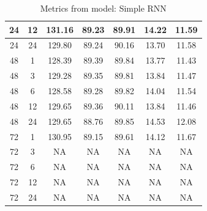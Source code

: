 \begin{table}[H]
\begin{tabular}{|c|c||c|c|c|c|c|}
		\hline
		24 & 12 & 131.16 & 89.23 & 89.91 & 14.22 & 11.59 \\
		\hline
		24 & 24 & 129.80 & 89.24 & 90.16 & 13.70 & 11.58 \\
		\hline
		48 &  1 & 128.39 & 89.39 & 89.84 & 13.77 & 11.43 \\
		\hline
		48 &  3 & 129.28 & 89.35 & 89.81 & 13.84 & 11.47 \\
		\hline
		48 &  6 & 128.58 & 89.28 & 89.82 & 14.04 & 11.54 \\
		\hline
		48 & 12 & 129.65 & 89.36 & 90.11 & 13.84 & 11.46 \\
		\hline
		48 & 24 & 129.65 & 88.76 & 89.85 & 14.53 & 12.08 \\
		\hline
		72 &  1 & 130.95 & 89.15 & 89.61 & 14.12 & 11.67 \\
		\hline
		72 &  3 &     NA &    NA &    NA &    NA &    NA \\
		\hline
		72 &  6 &     NA &    NA &    NA &    NA &    NA \\
		\hline
		72 & 12 &     NA &    NA &    NA &    NA &    NA \\
		\hline
		72 & 24 &     NA &    NA &    NA &    NA &    NA \\
		\hline
	\end{tabular}
	\caption{Metrics from model: Simple RNN}
	\label{tbl:rnn}
\end{table}

